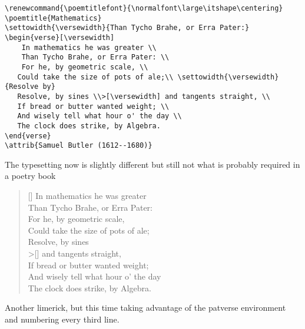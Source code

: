 \begin{lstlisting}[language={[common]TeX},% 
                           alsolanguage={[LaTeX]TeX},% 
                           alsolanguage={[primitive]TeX},%
                           alsolanguage={Verse}]
\renewcommand{\poemtitlefont}{\normalfont\large\itshape\centering}
\poemtitle{Mathematics}
\settowidth{\versewidth}{Than Tycho Brahe, or Erra Pater:}
\begin{verse}[\versewidth]
    In mathematics he was greater \\
    Than Tycho Brahe, or Erra Pater: \\
    For he, by geometric scale, \\
   Could take the size of pots of ale;\\ \settowidth{\versewidth}{Resolve by}
   Resolve, by sines \\>[\versewidth] and tangents straight, \\
   If bread or butter wanted weight; \\
   And wisely tell what hour o' the day \\
   The clock does strike, by Algebra.
\end{verse}
\attrib{Samuel Butler (1612--1680)}
\end{lstlisting}

The typesetting now is slightly different but still not what is probably required in a poetry book

\begin{verse}[\versewidth]
    In mathematics he was greater \\
    Than Tycho Brahe, or Erra Pater: \\
    For he, by geometric scale, \\
   Could take the size of pots of ale;\\ \settowidth{\versewidth}{Resolve by}
   Resolve, by sines \\>[\versewidth] and tangents straight, \\
   If bread or butter wanted weight; \\
   And wisely tell what hour o' the day \\
   The clock does strike, by Algebra.
\end{verse}
\bigskip


Another limerick, but this time taking advantage of the patverse environment
and numbering every third line.

